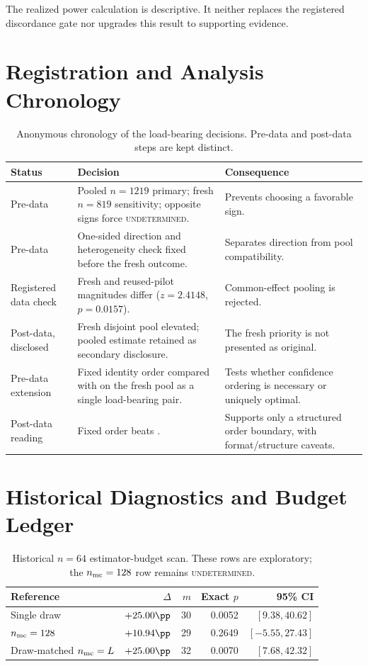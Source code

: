 The realized power calculation is descriptive.  It neither replaces the
registered discordance gate nor upgrades this result to supporting evidence.

\section{Registration and Analysis Chronology}
\label{app:revision}

\begin{table}[H]
\centering
\small
\setlength{\tabcolsep}{4pt}
\caption{Anonymous chronology of the load-bearing decisions.  Pre-data and
post-data steps are kept distinct.}
\label{tab:revision-chain}
\begin{tabularx}{\textwidth}{@{}p{}XX@{}}
\toprule
Status & Decision & Consequence \\
\midrule
Pre-data & Pooled $n=1219$ primary; fresh $n=819$ sensitivity; opposite signs
force \textsc{undetermined}. & Prevents choosing a favorable sign. \\
Pre-data & One-sided direction and heterogeneity check fixed before the fresh
outcome. & Separates direction from pool compatibility. \\
Registered data check & Fresh and reused-pilot magnitudes differ
($z=2.4148$, $p=0.0157$). & Common-effect pooling is rejected. \\
Post-data, disclosed & Fresh disjoint pool elevated; pooled estimate retained
as secondary disclosure. & The fresh priority is not presented as original. \\
Pre-data extension & Fixed identity order compared with \sconf{} on the fresh
pool as a single load-bearing pair. & Tests whether confidence ordering is
necessary or uniquely optimal. \\
Post-data reading & Fixed order beats \sconf{}. & Supports only a structured
order boundary, with format/structure caveats. \\
\bottomrule
\end{tabularx}
\end{table}

\section{Historical Diagnostics and Budget Ledger}
\label{app:diagnostics}

\begin{table}[H]
\centering
\small
\caption{Historical $n=64$ estimator-budget scan.  These rows are
exploratory; the $n_{\rm mc}=128$ row remains \textsc{undetermined}.}
\label{tab:estimator-scan}
\begin{tabular}{@{}lrrrr@{}}
\toprule
Reference & $\Delta$ & $m$ & Exact $p$ & 95\% CI \\
\midrule
Single draw & $+25.00\pp$ & 30 & 0.0052 & $[9.38,40.62]$ \\
$n_{\rm mc}=128$ & $+10.94\pp$ & 29 & 0.2649 & $[-5.55,27.43]$ \\
Draw-matched $n_{\rm mc}=L$ & $+25.00\pp$ & 32 & 0.0070 & $[7.68,42.32]$ \\
\bottomrule
\end{tabular}
\end{table}

